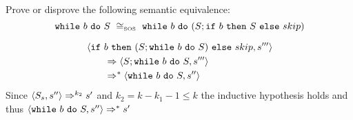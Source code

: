 \begin{exercise}{
    Prove or disprove the following semantic equivalence:
    \[ \wwhile{b}{S}\ \cong_{\text{\tiny SOS}}\ \wwhile{b}{(S;\wif{b}{S}{skip})} \]
}
\begin{itemize}
\begin{itemize}
\begin{itemize}
\begin{itemize}
\begin{align*}
                                        &\left<\texttt{if}\ b\ \texttt{then}\ (S; \texttt{while}\ b\ \texttt{do}\ S)\ \texttt{else}\ skip, s'''\right>
                                        \\&\qquad\Rightarrow \left<S; \texttt{while}\ b\ \texttt{do}\ S, s'''\right>
                                        \\&\qquad\Rightarrow^* \left<\texttt{while}\ b\ \texttt{do}\ S, s''\right>
                                    \end{align*}
                                    Since $\left<S_s, s''\right> \Rightarrow^{k_2} s'$ and $k_2 = k - k_1 - 1 \leq k$ the inductive hypothesis holds and thus $\left<\texttt{while}\ b\ \texttt{do}\ S, s''\right> \Rightarrow^* s'$
                            \end{itemize}
                    \end{itemize}
            \end{itemize}
    \end{itemize}
\end{exercise}
